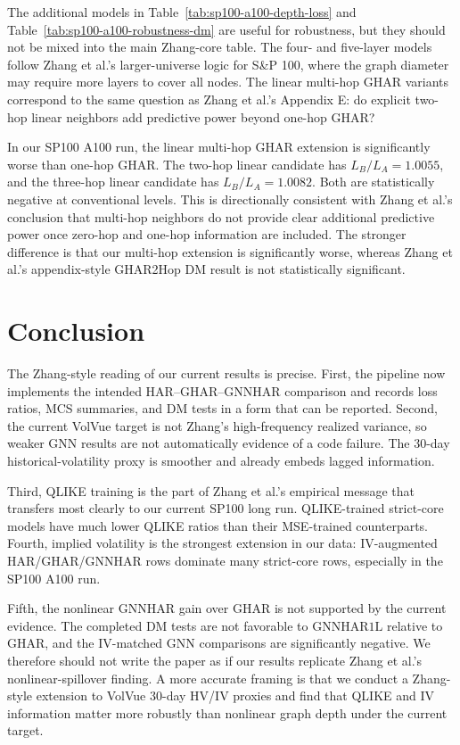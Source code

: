 \documentclass[11pt]{article}
\begin{document}
The additional models in Table~\ref{tab:sp100-a100-depth-loss} and Table~\ref{tab:sp100-a100-robustness-dm} are useful for robustness, but they should not be mixed into the main Zhang-core table.
The four- and five-layer models follow Zhang et al.'s larger-universe logic for S\&P 100, where the graph diameter may require more layers to cover all nodes.
The linear multi-hop GHAR variants correspond to the same question as Zhang et al.'s Appendix E: do explicit two-hop linear neighbors add predictive power beyond one-hop GHAR?





In our SP100 A100 run, the linear multi-hop GHAR extension is significantly worse than one-hop GHAR.
The two-hop linear candidate has \(L_B/L_A=1.0055\), and the three-hop linear candidate has \(L_B/L_A=1.0082\).
Both are statistically negative at conventional levels.
This is directionally consistent with Zhang et al.'s conclusion that multi-hop neighbors do not provide clear additional predictive power once zero-hop and one-hop information are included.
The stronger difference is that our multi-hop extension is significantly worse, whereas Zhang et al.'s appendix-style GHAR2Hop DM result is not statistically significant.

\section{Conclusion}

The Zhang-style reading of our current results is precise.
First, the pipeline now implements the intended HAR--GHAR--GNNHAR comparison and records loss ratios, MCS summaries, and DM tests in a form that can be reported.
Second, the current VolVue target is not Zhang's high-frequency realized variance, so weaker GNN results are not automatically evidence of a code failure.
The 30-day historical-volatility proxy is smoother and already embeds lagged information.

Third, QLIKE training is the part of Zhang et al.'s empirical message that transfers most clearly to our current SP100 long run.
QLIKE-trained strict-core models have much lower QLIKE ratios than their MSE-trained counterparts.
Fourth, implied volatility is the strongest extension in our data: IV-augmented HAR/GHAR/GNNHAR rows dominate many strict-core rows, especially in the SP100 A100 run.

Fifth, the nonlinear GNNHAR gain over GHAR is not supported by the current evidence.
The completed DM tests are not favorable to \(\mathrm{GNNHAR1L}\) relative to \(\mathrm{GHAR}\), and the IV-matched GNN comparisons are significantly negative.
We therefore should not write the paper as if our results replicate Zhang et al.'s nonlinear-spillover finding.
A more accurate framing is that we conduct a Zhang-style extension to VolVue 30-day HV/IV proxies and find that QLIKE and IV information matter more robustly than nonlinear graph depth under the current target.
\end{document}
